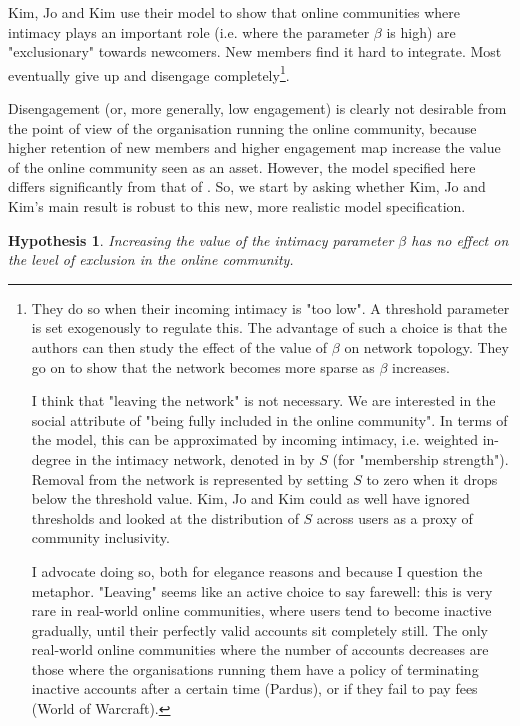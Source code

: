 \documentclass{article}
\begin{document}
Kim, Jo and Kim use their model to show that online communities where intimacy plays an important role (i.e. where the parameter $\beta$ is high) are "exclusionary" towards newcomers. New members find it hard to integrate. Most eventually give up and disengage completely\footnote{They do so when their incoming intimacy is "too low". A threshold parameter is set exogenously to regulate this. The advantage of such a choice is that the authors can then study the effect of the value of $\beta$ on network topology. They go on to show that the network becomes more sparse as $\beta$ increases.

I think that "leaving the network" is not necessary. We are interested in the social attribute of "being fully included in the online community". In terms of the model, this can be approximated by incoming intimacy, i.e. weighted in-degree in the intimacy network, denoted in \cite{kim2015group} by $S$ (for "membership strength"). Removal from the network is represented by setting $S$ to zero when it drops below the threshold value. Kim, Jo and Kim could as well have ignored thresholds and looked at the distribution of $S$ across users as a proxy of community inclusivity. 

I advocate doing so, both for elegance reasons and because I question the metaphor. "Leaving" seems like an active choice to say farewell: this is very rare in real-world online communities, where users tend to become inactive gradually, until their perfectly valid accounts sit completely still. The only real-world online communities where the number of accounts decreases are those where the organisations running them have a policy of terminating inactive accounts after a certain time (Pardus), or if they fail to pay fees (World of Warcraft). 
}. 

Disengagement (or, more generally, low engagement) is clearly not desirable from the point of view of the organisation running the online community, because higher retention of new members and higher engagement map increase the value of the online community seen as an asset. However, the model specified here differs significantly from that of \cite{kim2015group}. So, we start by asking whether Kim, Jo and Kim's main result is robust to this new, more realistic model specification. 

\newtheorem{intimacy}{Hypothesis}

\begin{intimacy}
	Increasing the value of the intimacy parameter $\beta$ has no effect on the level of exclusion in the online community. 
	\label{intimacyModelHolds}
\end{intimacy}
\end{document}
